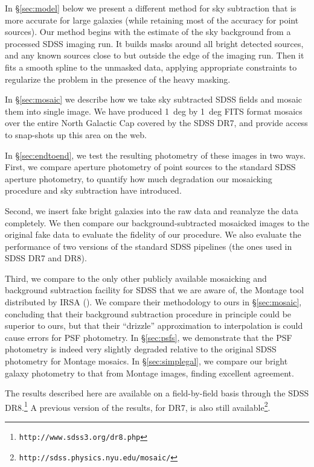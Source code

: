 \documentclass[10pt,preprint]{aastex}
\begin{document}
In \S\ref{sec:model} below we present a different method for sky
subtraction that is more accurate for large galaxies (while retaining
most of the accuracy for point sources). Our method begins with the
estimate of the sky background from a processed SDSS imaging run.  It
builds masks around all bright detected sources, and any known sources
close to but outside the edge of the imaging run. Then it fits a
smooth spline to the unmasked data, applying appropriate constraints
to regularize the problem in the presence of the heavy masking.

In \S\ref{sec:mosaic} we describe how we take sky subtracted SDSS
fields and mosaic them into single image. We have produced 1~deg by
1~deg FITS format mosaics over the entire North Galactic Cap covered
by the SDSS DR7, and provide access to snap-shots up this area on the
web.

In \S\ref{sec:endtoend}, we test the resulting photometry of these images
in two ways.  First, we compare aperture photometry of point sources
to the standard SDSS aperture photometry, to quantify how much
degradation our mosaicking procedure and sky subtraction have
introduced.

Second, we insert fake bright galaxies into the raw data and reanalyze
the data completely.  We then compare our background-subtracted
mosaicked images to the original fake data to evaluate the fidelity of
our procedure. We also evaluate the performance of two versions of the
standard SDSS pipelines (the ones used in SDSS DR7 and DR8).

Third, we compare to the only other publicly available mosaicking and
background subtraction facility for SDSS that we are aware of, the
Montage tool distributed by IRSA (\citealt{berriman03a}). We compare
their methodology to ours in \S\ref{sec:mosaic}, concluding that their
background subtraction procedure in principle could be superior to
ours, but that their ``drizzle'' approximation to interpolation is
could cause errors for PSF photometry. In \S\ref{sec:psfs}, we
demonstrate that the PSF photometry is indeed very slightly degraded
relative to the original SDSS photometry for Montage mosaics. In
\S\ref{sec:simplegal}, we compare our bright galaxy photometry to that
from Montage images, finding excellent agreement.

The results described here are available on a field-by-field basis
through the SDSS DR8.\footnote{\tt http://www.sdss3.org/dr8.php} A
previous version of the results, for DR7, is also still
available\footnote{\tt http://sdss.physics.nyu.edu/mosaic/}.
\end{document}
